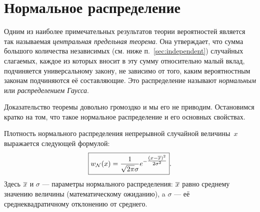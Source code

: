 

\section{Нормальное распределение}\label{sec:normal}

Одним из наиболее примечательных результатов теории вероятностей является
так называемая \emph{центральная предельная теорема}. Она утверждает,
что сумма большого количества независимых (см. ниже п.~\ref{sec:independent}) случайных слагаемых, каждое
из которых вносит в эту сумму относительно малый вклад, подчиняется
универсальному закону, не зависимо от того, каким вероятностным законам
подчиняются её составляющие. Это распределение называют \emph{нормальным}
или \emph{распределением Гаусса}.

Доказательство теоремы довольно громоздко и мы его не приводим. Остановимся
кратко на том, что такое нормальное распределение и его основных свойствах.

Плотность нормального распределения непрерывной случайной величины~$x$ выражается следующей формулой:
\begin{equation}
    \label{eq:normal}
    \boxed{
w_{\mathcal{N}}\!\left(x\right)=\frac{1}{\sqrt{2\pi}\sigma}e^{-\tfrac{(x-\overline{x})^
{2}}{2\sigma^{2}}}
    }.
\end{equation}
Здесь $\overline{x}$ и $\sigma$
--- параметры нормального распределения: $\overline{x}$ равно
среднему значению величины (математическому ожиданию), a $\sigma$ ---
её среднеквадратичному отклонению от среднего.

